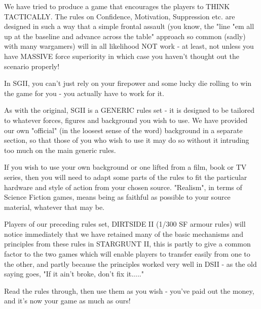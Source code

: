 We have tried to produce a game that encourages the players to THINK TACTICALLY. The rules on Confidence, Motivation, Suppression etc. are designed in such a way that a simple frontal assault (you know, the "line "em all up at the baseline and advance across the table" approach so common (sadly) with many wargamers) will in all likelihood NOT work - at least, not unless you have MASSIVE force superiority in which case you haven't thought out the scenario properly!

In SGII, you can't just rely on your firepower and some lucky die rolling to win the game for you - you actually have to work for it.

As with the original, SGII is a GENERIC rules set - it is designed to be tailored to whatever forces, figures and background you wish to use. We have provided our own "official" (in the loosest sense of the word) background in a separate section, so that those of you who wish to use it may do so without it intruding too much on the main generic rules.

If you wish to use your own background or one lifted from a film, book or TV series, then you will need to adapt some parts of the rules to fit the particular hardware and style of action from your chosen source. "Realism", in terms of Science Fiction games, means being as faithful as possible to your source material, whatever that may be.

Players of our preceding rules set, DIRTSIDE II (1/300 SF armour rules) will notice immediately that we have retained many of the basic mechanisms and principles from these rules in STARGRUNT II, this is partly to give a common factor to the two games which will enable players to transfer easily from one to the other, and partly because the principles worked very well in DSII - as the old saying goes, "If it ain't broke, don't fix it....."

Read the rules through, then use them as you wish - you've paid out the money, and it's now your game as much as ours!



